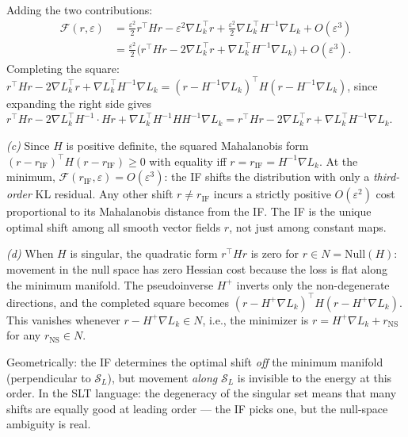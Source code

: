 \documentclass[11pt]{article}
\begin{document}
\begin{solution}[ex:bif-ot]
Adding the two contributions:
\begin{align*}
  \mathcal{F}(r,\varepsilon) &= \frac{\varepsilon^2}{2}r^\top Hr - \varepsilon^2\nabla L_k^\top r + \frac{\varepsilon^2}{2}\nabla L_k^\top H^{-1}\nabla L_k + O(\varepsilon^3) \\
  &= \frac{\varepsilon^2}{2}\bigl(r^\top Hr - 2\nabla L_k^\top r + \nabla L_k^\top H^{-1}\nabla L_k\bigr) + O(\varepsilon^3).
\end{align*}
Completing the square: $r^\top Hr - 2\nabla L_k^\top r + \nabla L_k^\top H^{-1}\nabla L_k = (r - H^{-1}\nabla L_k)^\top H(r - H^{-1}\nabla L_k)$, since expanding the right side gives $r^\top Hr - 2\nabla L_k^\top H^{-1}\cdot Hr + \nabla L_k^\top H^{-1}HH^{-1}\nabla L_k = r^\top Hr - 2\nabla L_k^\top r + \nabla L_k^\top H^{-1}\nabla L_k$.

\textit{(c)} Since $H$ is positive definite, the squared Mahalanobis form $(r-r_{\mathrm{IF}})^\top H(r-r_{\mathrm{IF}}) \ge 0$ with equality iff $r = r_{\mathrm{IF}} = H^{-1}\nabla L_k$. At the minimum, $\mathcal{F}(r_{\mathrm{IF}},\varepsilon) = O(\varepsilon^3)$: the IF shifts the distribution with only a \emph{third-order} KL residual. Any other shift $r\ne r_{\mathrm{IF}}$ incurs a strictly positive $O(\varepsilon^2)$ cost proportional to its Mahalanobis distance from the IF. The IF is the unique optimal shift among all smooth vector fields $r$, not just among constant maps.

\textit{(d)} When $H$ is singular, the quadratic form $r^\top Hr$ is zero for $r\in N = \mathrm{Null}(H)$: movement in the null space has zero Hessian cost because the loss is flat along the minimum manifold. The pseudoinverse $H^+$ inverts only the non-degenerate directions, and the completed square becomes $(r - H^+\nabla L_k)^\top H(r - H^+\nabla L_k)$. This vanishes whenever $r - H^+\nabla L_k \in N$, i.e., the minimizer is $r = H^+\nabla L_k + r_{\mathrm{NS}}$ for any $r_{\mathrm{NS}}\in N$.

Geometrically: the IF determines the optimal shift \emph{off} the minimum manifold (perpendicular to $\mathcal{S}_L$), but movement \emph{along} $\mathcal{S}_L$ is invisible to the energy at this order. In the SLT language: the degeneracy of the singular set means that many shifts are equally good at leading order --- the IF picks one, but the null-space ambiguity is real.


\end{solution}
\end{document}
